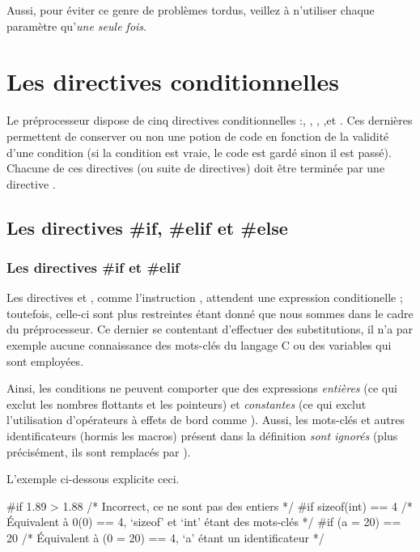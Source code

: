 Aussi, pour éviter ce genre de problèmes tordus, veillez à n'utiliser
chaque paramètre qu'\emph{une seule fois}.

\section{Les directives conditionnelles}
\label{les-directives-conditionnelles}

Le préprocesseur dispose de cinq directives conditionnelles :,
, , ,et . Ces 
dernières permettent de conserver ou non une potion de code en fonction
de la validité d'une condition (si la condition est vraie, le code est gardé 
sinon il est passé). Chacune de ces directives (ou suite de directives)
doit être terminée par une directive .

\subsection{Les directives \#if, \#elif et \#else}
\label{les-directives-if-elif-et-else}

\subsubsection{Les directives \#if et \#elif}
\label{les-directives-if-et-elif}

Les directives  et , comme l'instruction
, attendent une expression conditionelle ; toutefois,
celle-ci sont plus restreintes étant donné que nous sommes dans le cadre
du préprocesseur. Ce dernier se contentant d'effectuer des
substitutions, il n'a par exemple aucune connaissance des mots-clés du
langage C ou des variables qui sont employées.

Ainsi, les conditions ne peuvent comporter que des expressions
\emph{entières} (ce qui exclut les nombres flottants et les pointeurs)
et \emph{constantes} (ce qui exclut l'utilisation d'opérateurs à effets
de bord comme \mybox{=}). Aussi, les mots-clés et autres
identificateurs (hormis les macros) présent dans la définition
\emph{sont ignorés} (plus précisément, ils sont remplacés par
).

L'exemple ci-dessous explicite ceci.

\begin{C}
#if 1.89 > 1.88 /* Incorrect, ce ne sont pas des entiers */
#if sizeof(int) == 4 /* Équivalent à 0(0) == 4, `sizeof' et `int' étant des mots-clés */
#if (a = 20) == 20 /* Équivalent à (0 = 20) == 4, `a' étant un identificateur */
\end{C}

